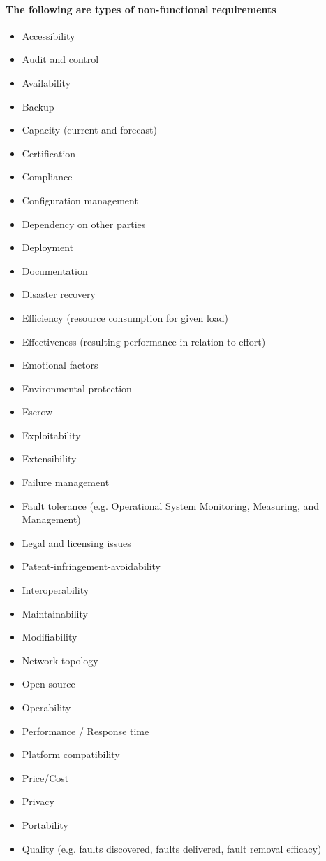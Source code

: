 \documentclass{acm_proc_article-sp}
\begin{document}
\paragraph{The following are types of non-functional requirements}
\begin{itemize} 
\item Accessibility
\item Audit and control
\item Availability
\item Backup
\item Capacity (current and forecast)
\item Certification
\item Compliance
\item Configuration management
\item Dependency on other parties
\item Deployment
\item Documentation
\item Disaster recovery
\item Efficiency (resource consumption for given load)
\item Effectiveness (resulting performance in relation to effort)
\item Emotional factors
\item Environmental protection
\item Escrow
\item Exploitability
\item Extensibility
\item Failure management
\item Fault tolerance (e.g. Operational System Monitoring, Measuring, and Management)
\item Legal and licensing issues
\item Patent-infringement-avoidability
\item Interoperability
\item Maintainability
\item Modifiability
\item Network topology
\item Open source
\item Operability
\item Performance / Response time
\item Platform compatibility
\item Price/Cost
\item Privacy
\item Portability
\item Quality (e.g. faults discovered, faults delivered, fault removal efficacy)

\end{itemize}
\end{document}
